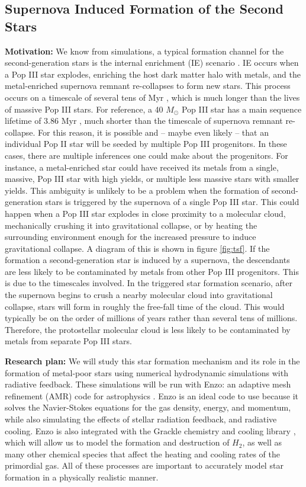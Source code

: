 \documentclass[a4paper, 12pt]{article}
\begin{document}
\subsection{Supernova Induced Formation of the Second Stars}
\label{sec:tsf}

\textbf{Motivation:} We know from simulations, a typical formation channel for the second-generation stars is the internal enrichment (IE) scenario \citep{Chiaki2019}. IE occurs when a Pop III star explodes, enriching the host dark matter halo with metals, and the metal-enriched supernova remnant re-collapses to form new stars. This process occurs on a timescale of several tens of Myr \citep{Chiaki2019}, which is much longer than the lives of massive Pop III stars. For reference, a 40 $M_\odot$ Pop III star has a main sequence lifetime of 3.86 Myr \citep{Schaerer2002}, much shorter than the timescale of supernova remnant re-collapse. For this reason, it is possible and -- maybe even likely -- that an individual Pop II star will be seeded by multiple Pop III progenitors. In these cases, there are multiple inferences one could make about the progenitors. For instance, a metal-enriched star could have received its metals from a single, massive, Pop III star with high yields, or multiple less massive stars with smaller yields. This ambiguity is unlikely to be a problem when the formation of second-generation stars is triggered by the supernova of a single Pop III star. This could happen when a Pop III star explodes in close proximity to a molecular cloud, mechanically crushing it into gravitational collapse, or by heating the surrounding environment enough for the increased pressure to induce gravitational collapse. A diagram of this is shown in figure \ref{fig:tsf}. If the formation a second-generation star is induced by a supernova, the descendants are less likely to be contaminated by metals from other Pop III progenitors. This is due to the timescales involved. In the triggered star formation scenario, after the supernova begins to crush a nearby molecular cloud into gravitational collapse, stars will form in roughly the free-fall time of the cloud. This would typically be on the order of millions of years rather than several tens of millions. Therefore, the protostellar molecular cloud is less likely to be contaminated by metals from separate Pop III stars. 

\textbf{Research plan:} We will study this star formation mechanism and its role in the formation of metal-poor stars using numerical hydrodynamic simulations with radiative feedback. These simulations will be run with Enzo: an adaptive mesh refinement (AMR) code for astrophysics \citep{Bryan2014}. Enzo is an ideal code to use because it solves the Navier-Stokes equations for the gas density, energy, and momentum, while also simulating the effects of stellar radiation feedback, and radiative cooling. Enzo is also integrated with the Grackle chemistry and cooling library \citep{Smith2017}, which will allow us to model the formation and destruction of $H_2$, as well as many other chemical species that affect the heating and cooling rates of the primordial gas. All of these processes are important to accurately model star formation in a physically realistic manner. 
\end{document}
